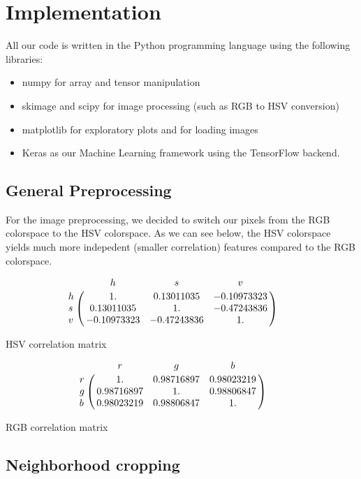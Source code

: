 \documentclass[10pt,conference,compsocconf]{IEEEtran}
\begin{document}
\section{Implementation}
All our code is written in the Python programming language using the following libraries:
\begin{itemize}
\item numpy for array and tensor manipulation
\item skimage and scipy for image processing (such as RGB to HSV conversion)
\item matplotlib for exploratory plots and for loading images
\item Keras \cite{chollet2015keras} as our Machine Learning framework using the TensorFlow backend.
\end{itemize}

\subsection{General Preprocessing}
For the image preprocessing, we decided to switch our pixels from the RGB colorspace to the HSV colorspace. As we can see below, the HSV colorspace yields much more indepedent (smaller correlation) features compared to the RGB colorspace.  

$$
    \bordermatrix{ & h & s & v \cr
      h & 1. & 0.13011035 & -0.10973323 \cr
      s & 0.13011035 & 1. & -0.47243836 \cr
      v & -0.10973323 & -0.47243836 & 1. } \qquad
$$

\begin{center}
HSV correlation matrix
\end{center}
$$
     \bordermatrix{ & r & g & b \cr
      r & 1. & 0.98716897 & 0.98023219 \cr
      g & 0.98716897 & 1. & 0.98806847 \cr
      b & 0.98023219 & 0.98806847 & 1. } \qquad
$$

\begin{center}
RGB correlation matrix
\end{center}

\subsection{Neighborhood cropping}
\end{document}
